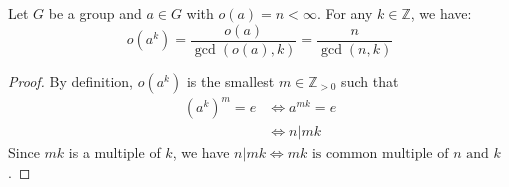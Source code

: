 \begin{itemize}
\begin{itemize}
    \end{itemize}
    \begin{theorem}
        Let $G$ be a group and $a\in G$ with $o(a)=n<\infty$. For any $k\in \mathbb{Z}$, we have:
        \begin{equation}
            o(a^k) = \frac{o(a)}{\gcd(o(a),k)} = \frac{n}{\gcd(n,k)}
        \end{equation}
    \end{theorem}
    \begin{proof}
        By definition, $o(a^k)$ is the smallest $m\in \mathbb{Z}_{>0}$ such that
        \begin{align}
        (a^k)^m = e &\iff a^{mk} = e \\ 
        &\iff n | mk
        \end{align}
        Since $mk$ is a multiple of $k$, we have $n|mk \iff mk \text{ is common multiple of } n \text{ and } k$.


\end{proof}
\end{itemize}
